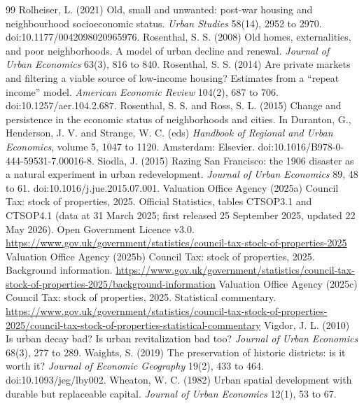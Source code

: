 \begin{thebibliography}{99}
 Rolheiser, L. (2021) Old, small and unwanted: post-war housing and neighbourhood socioeconomic status. \textit{Urban Studies} 58(14), 2952 to 2970. doi:10.1177/0042098020965976.
 Rosenthal, S. S. (2008) Old homes, externalities, and poor neighborhoods. A model of urban decline and renewal. \textit{Journal of Urban Economics} 63(3), 816 to 840.
 Rosenthal, S. S. (2014) Are private markets and filtering a viable source of low-income housing? Estimates from a ``repeat income'' model. \textit{American Economic Review} 104(2), 687 to 706. doi:10.1257/aer.104.2.687.
 Rosenthal, S. S. and Ross, S. L. (2015) Change and persistence in the economic status of neighborhoods and cities. In Duranton, G., Henderson, J. V. and Strange, W. C. (eds) \textit{Handbook of Regional and Urban Economics}, volume 5, 1047 to 1120. Amsterdam: Elsevier. doi:10.1016/B978-0-444-59531-7.00016-8.
 Siodla, J. (2015) Razing San Francisco: the 1906 disaster as a natural experiment in urban redevelopment. \textit{Journal of Urban Economics} 89, 48 to 61. doi:10.1016/j.jue.2015.07.001.
 Valuation Office Agency (2025a) Council Tax: stock of properties, 2025. Official Statistics, tables CTSOP3.1 and CTSOP4.1 (data at 31 March 2025; first released 25 September 2025, updated 22 May 2026). Open Government Licence v3.0. \url{https://www.gov.uk/government/statistics/council-tax-stock-of-properties-2025}
 Valuation Office Agency (2025b) Council Tax: stock of properties, 2025. Background information. \url{https://www.gov.uk/government/statistics/council-tax-stock-of-properties-2025/background-information}
 Valuation Office Agency (2025c) Council Tax: stock of properties, 2025. Statistical commentary. \url{https://www.gov.uk/government/statistics/council-tax-stock-of-properties-2025/council-tax-stock-of-properties-statistical-commentary}
 Vigdor, J. L. (2010) Is urban decay bad? Is urban revitalization bad too? \textit{Journal of Urban Economics} 68(3), 277 to 289.
 Waights, S. (2019) The preservation of historic districts: is it worth it? \textit{Journal of Economic Geography} 19(2), 433 to 464. doi:10.1093/jeg/lby002.
 Wheaton, W. C. (1982) Urban spatial development with durable but replaceable capital. \textit{Journal of Urban Economics} 12(1), 53 to 67.

\end{thebibliography}
